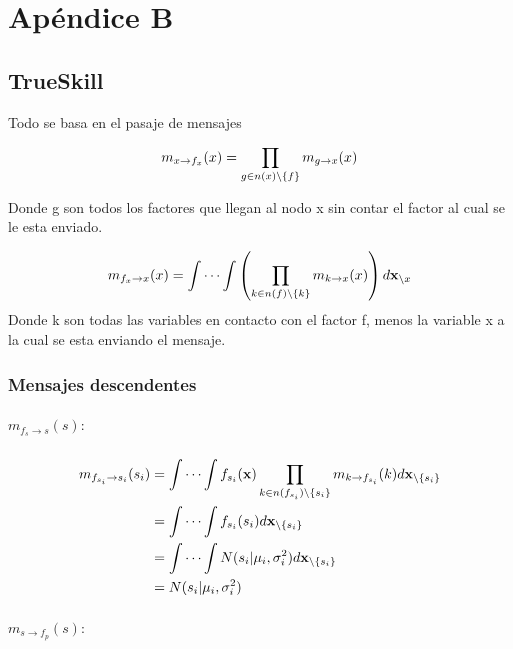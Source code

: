 \documentclass[11pt,twoside, spanish]{report} %
\begin{document}
\chapter{Ap\'endice B}
\section{TrueSkill}


Todo se basa en el pasaje de mensajes

\begin{equation}
	\centering
	m_{x\rightarrow f_{x}}(x) = \prod_{g\in n(x)\backslash\{f\}}m_{g\rightarrow x}(x)
\end{equation}

Donde g son todos los factores que llegan al nodo x sin contar el factor al cual se le esta enviado.

\begin{equation}
	\centering
	m_{f_{x}\rightarrow x}(x) = \int\cdots\int\left(\prod_{k\in n(f)\backslash\{k\}}m_{k\rightarrow x}(x)\right)d\textbf{x}_{\backslash x}
\end{equation}
Donde k son todas las variables en contacto con el factor f, menos la variable x a la cual se esta enviando el mensaje.

\subsection{Mensajes descendentes}
\label{appendix:mensajes}
\paragraph{$m_{f_{s}\rightarrow s}(s):$}

\begin{equation}
	\centering
	\begin{split}
		m_{f_{s_i}\rightarrow s_i}(s_i) & = \int\cdots\int f_{s_i}(\textbf{x})\prod_{k\in n(f_{s_i})\backslash\{s_i\}} m_{k\rightarrow f_{s_i}}(k)d\textbf{x}_{\backslash \{s_i\}} \\
		& = \int\cdots\int f_{s_i}(s_i)d\textbf{x}_{\backslash \{s_i\}} \\
		& = \int\cdots\int N(s_i \vert \mu_i,\sigma_i^2)d\textbf{x}_{\backslash \{s_i\}} \\
		& =  N(s_i \vert \mu_i,\sigma_i^2)
	\end{split}
\end{equation}

\paragraph{$m_{s\rightarrow f_{p}}(s):$}
\end{document}

